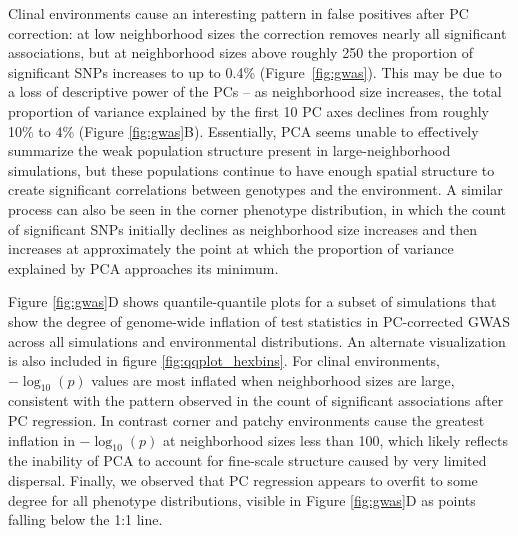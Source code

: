 \documentclass[10pt,twoside,lineno,hidelinks]{preprint}
\begin{document}
Clinal environments cause an interesting pattern in false positives after PC correction: at low neighborhood sizes the correction removes nearly all significant associations, 
but at neighborhood sizes above roughly 250 the proportion of significant SNPs increases to up to 0.4\% (Figure~\ref{fig:gwas}). 
This may be due to a loss of descriptive power of the PCs
-- as neighborhood size increases, the total proportion of variance explained by the first 10 PC axes declines from roughly 10\% to 4\% (Figure \ref{fig:gwas}B). 
Essentially, PCA seems unable to effectively summarize the weak population structure present in large-neighborhood simulations, but these populations continue to have enough spatial structure to create significant correlations between genotypes and the environment. A similar process can also be seen in the corner phenotype distribution, in which the count of significant SNPs initially declines as neighborhood size increases and then increases at approximately the point at which the proportion of variance explained by PCA approaches its minimum. 

Figure \ref{fig:gwas}D shows quantile-quantile plots for a subset of simulations that show the degree of genome-wide inflation of test statistics in PC-corrected GWAS across all simulations and environmental distributions. 
An alternate visualization is also included in figure \ref{fig:qqplot_hexbins}.
For clinal environments, $-\log_{10}(p)$ values are most inflated when neighborhood sizes are large, consistent with the pattern observed in the count of significant associations after PC regression. In contrast corner and patchy environments cause the greatest inflation in $-\log_{10}(p)$ at neighborhood sizes less than 100, which likely reflects the inability of PCA to account for fine-scale structure caused by very limited dispersal. Finally, we observed that PC regression appears to overfit to some degree for all phenotype distributions, visible in Figure \ref{fig:gwas}D as points falling below the 1:1 line.
\end{document}
